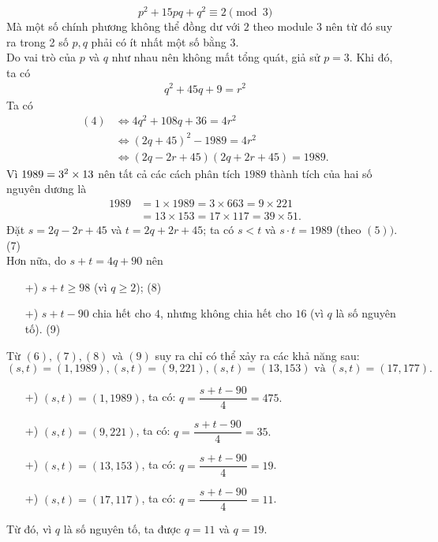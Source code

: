 \begin{bt}
{\begin{itemize}
			\[p^2+15pq+q^2\equiv 2\pmod{3}\]
			Mà một số chính phương không thể đồng dư với $2$ theo module $3$ nên từ đó suy ra trong 2 số $p,q$ phải có ít nhất một số bằng 3.\\
			Do vai trò của $p$ và $q$ như nhau nên không mất tổng quát, giả sử $p=3$. Khi đó, ta có
			\begin{align*} 
			q^2+45q+9=r^2 \tag{4}
			\end{align*}
			Ta có
			{\allowdisplaybreaks
			\begin{align*} 
			(4)&\Leftrightarrow 4q^2+108q+36=4r^2\\
			& \Leftrightarrow(2q+45)^2-1989=4r^2\\
			&\Leftrightarrow (2q-2r+45)(2q+2r+45)=1989. \tag{5}
			\end{align*}}Vì $1989=3^2\times 13\time 17$ nên tất cả các cách phân tích $1989$ thành tích của hai số nguyên dương là
			\begin{align*} 
			1989&=1\times 1989 =3\times 663=9\times 221\\
			& =13\times 153 = 17\times 117  = 39\times 51. \tag{6}
			\end{align*}
			Đặt $s=2q-2r+45$ và $t=2q+2r+45$; ta có $s<t$ và $s\cdot t=1989$ (theo $(5))$.\hspace{\fill} (7)\\			
			Hơn nữa, do $s+t=4q+90$ nên
			\begin{itemize}
				\item[+)] $s+t\ge 98$ (vì $q\ge 2$); \hspace{\fill} (8)
				\item[+)] $s+t-90$ chia hết cho $4$, nhưng không chia hết cho $16$ (vì $q$ là số nguyên tố). \hspace{\fill} (9)
			\end{itemize}
			Từ $(6),(7),(8)$ và $(9)$ suy ra chỉ có thể xảy ra các khả năng sau:
			\[(s,t)=(1,1989),(s,t)=(9,221), (s,t)=(13,153) \text{ và } (s,t)=(17,177).\]
		\end{itemize}
		\begin{itemize}
			\item[+)] $(s,t)=(1,1989)$, ta có:
		$q=\dfrac{s+t-90}{4}=475.$
			\item[+)] $(s,t)=(9,221)$, ta có:
			$q=\dfrac{s+t-90}{4}=35.$
			\item[+)] $(s,t)=(13,153)$, ta có:
			$q=\dfrac{s+t-90}{4}=19$.
			\item[+)] $(s,t)=(17,117)$, ta có:
			$q=\dfrac{s+t-90}{4}=11$.
		\end{itemize}
		Từ đó, vì $q$ là số nguyên tố, ta được $q=11$ và $q=19$.\\
}
\end{bt}
